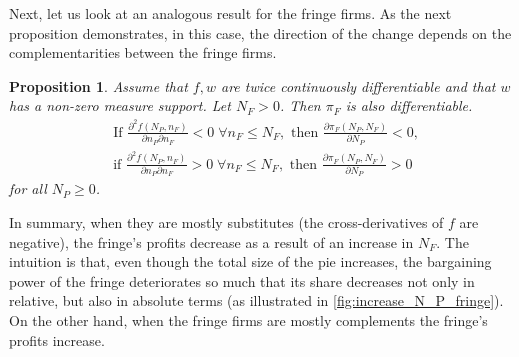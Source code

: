 \documentclass[a4paper]{article}
\newtheorem{proposition}{Proposition}
\begin{document}
Next, let us look at an analogous result for the fringe firms.
As the next proposition demonstrates, in this case, the direction of the change depends on the complementarities between the fringe firms.
\begin{proposition}
    \label{prop:share_of_fringe}
    Assume that $f, w$ are twice continuously differentiable and that $w$ has a non-zero measure support.
    Let $N_F > 0$.
    Then $\pi_F$ is also differentiable.
    \begin{align*}
        &\text{If } \frac{\partial^2 f(N_P, n_F)}{\partial n_P \partial n_F} < 0 \;\forall n_F \leq N_F, \text{ then } \frac{\partial \pi_F(N_P, N_F)}{\partial N_P} < 0, \\
        &\text{if } \frac{\partial^2 f(N_P, n_F)}{\partial n_P \partial n_F} > 0 \;\forall n_F \leq N_F, \text{ then } \frac{\partial \pi_F(N_P, N_F)}{\partial N_P} > 0
    \end{align*}
    for all $N_P \geq 0$.
\end{proposition}
In summary, when they are mostly substitutes (the cross-derivatives of $f$ are negative), the fringe's profits decrease as a result of an increase in $N_F$.
The intuition is that, even though the total size of the pie increases, the bargaining power of the fringe deteriorates so much that its share decreases not only in relative, but also in absolute terms (as illustrated in \cref{fig:increase_N_P_fringe}).
On the other hand, when the fringe firms are mostly complements the fringe's profits increase.
\end{document}
